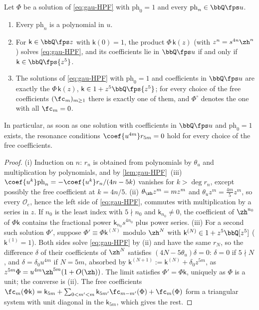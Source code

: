 
\begin{lem}
\label{lem:gau-poly}
Let $\Phi$ be a solution of \eqref{eq:gau-HPF} with $\mathrm{ph}_0=1$ and every $\mathrm{ph}_n\in\bbQ\fps u$.
\begin{enumerate}
\item Every $\mathrm{ph}_n$ is a polynomial in $u$.
\item For $\mathsf k\in\bbQ\fps z$ with $\mathsf k(0)=1$, the product $\Phi\,\mathsf k(z)$ (with $z^n=s^{4n}\zh^n$) solves \eqref{eq:gau-HPF}, and its coefficients lie in $\bbQ\fps u$ if and only if $\mathsf k\in\bbQ\fps{z^5}$.
\item The solutions of \eqref{eq:gau-HPF} with $\mathrm{ph}_0=1$ and coefficients in $\bbQ\fps u$ are exactly the $\Phi\,\mathsf k(z)$, $\mathsf k\in1+z^5\bbQ\fps{z^5}$; for every choice of the free coefficients $(\fc_m)_{m\geq1}$ there is exactly one of them, and $\Phi^\circ$ denotes the one with all $\fc_m=0$.
\end{enumerate}
In particular, as soon as one solution with coefficients in $\bbQ\fps u$ and $\mathrm{ph}_0=1$ exists, the resonance conditions $\coef{u^{4m}}r_{5m}=0$ hold for every choice of the free coefficients.
\end{lem}

\begin{proof}
(i) Induction on $n$: $r_n$ is obtained from polynomials by $\theta_u$ and multiplication by polynomials, and by \cref{lem:gau-HPF}~(iii) $\coef{u^k}\mathrm{ph}_n=-\coef{u^k}r_n/(4n-5k)$ vanishes for $k>\deg r_n$, except possibly the free coefficient at $k=4n/5$. (ii) $\theta_{\zh}z^m=mz^m$ and $\theta_uz^m=\frac{4m}5z^m$, so every $\mathscr O_e$, hence the left side of \eqref{eq:gau-HPF}, commutes with multiplication by a series in $z$. If $n_0$ is the least index with $5\nmid n_0$ and $\mathsf k_{n_0}\neq0$, the coefficient of $\zh^{n_0}$ of $\Phi\mathsf k$ contains the fractional power $\mathsf k_{n_0}s^{4n_0}$ plus power series. (iii) For a second such solution $\Phi'$, suppose $\Phi'\equiv\Phi\mathsf k^{(N)}$ modulo $\zh^N$ with $\mathsf k^{(N)}\in1+z^5\bbQ[z^5]$ ($\mathsf k^{(1)}=1$). Both sides solve \eqref{eq:gau-HPF} by (ii) and have the same $r_N$, so the difference $\delta$ of their coefficients of $\zh^N$ satisfies $(4N-5\theta_u)\delta=0$: $\delta=0$ if $5\nmid N$, and $\delta=\delta_0u^{4m}$ if $N=5m$, absorbed by $\mathsf k^{(N+1)}:=\mathsf k^{(N)}+\delta_0z^{5m}$, as $z^{5m}\Phi=u^{4m}\zh^{5m}(1+O(\zh))$. The limit satisfies $\Phi'=\Phi\mathsf k$, uniquely as $\Phi$ is a unit; the converse is (ii). The free coefficients $\fc_m(\Phi\mathsf k)=\mathsf k_{5m}+\sum_{0<m'<m}\mathsf k_{5m'}\fc_{m-m'}(\Phi)+\fc_m(\Phi)$ form a triangular system with unit diagonal in the $\mathsf k_{5m}$, which gives the rest.
\end{proof}

